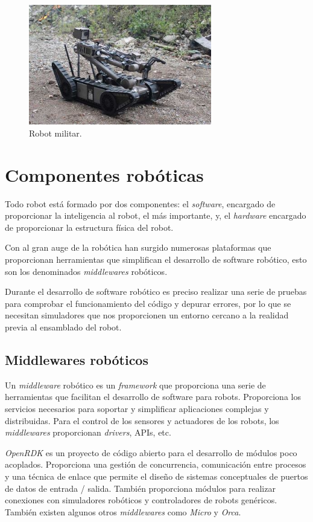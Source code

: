 \documentclass[a4paper, 12pt]{book}
\begin{document}
\begin{figure}[H]
	\centering
    \includegraphics[width=8cm]{img/robot_militar}
    \caption{Robot militar.}
    \label{figura:coche_autonomo}
\end{figure}

\section{Componentes robóticas}
\label{subsec:componentes roboticas}

Todo robot está formado por dos componentes: el \textit{software}, encargado de proporcionar la inteligencia al robot, el más importante, y, el \textit{hardware} encargado de proporcionar la estructura física del robot.

Con al gran auge de la robótica han surgido numerosas plataformas que proporcionan herramientas que simplifican el desarrollo de software robótico, esto son los denominados \textit{middlewares} robóticos.

Durante el desarrollo de software robótico es preciso realizar una serie de pruebas para comprobar el funcionamiento del código y depurar errores, por lo que se necesitan simuladores que nos proporcionen un entorno cercano a la realidad previa al ensamblado del robot.

\subsection{Middlewares robóticos}
\label{subsec:middlewares}

Un \textit{middleware} robótico es un \textit{framework} que proporciona una serie de herramientas que facilitan el desarrollo de software para robots. Proporciona los servicios necesarios para soportar y simplificar aplicaciones complejas y distribuidas. Para el control de los sensores y actuadores de los robots, los \textit{middlewares} proporcionan \textit{drivers}, APIs, etc.

\emph{OpenRDK} es un proyecto de código abierto para el desarrollo de módulos poco acoplados. Proporciona una gestión de concurrencia, comunicación entre procesos y una técnica de enlace que permite el diseño de sistemas conceptuales de puertos de datos de entrada / salida. También proporciona módulos para realizar conexiones con simuladores robóticos y controladores de robots genéricos. También existen algunos otros \emph{middlewares} como \emph{Micro} y \emph{Orca}.
\end{document}
